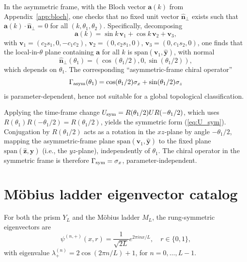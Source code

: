 \documentclass[aps,pra,reprint,amsmath,amssymb,superscriptaddress,nofootinbib,longbibliography]{revtex4-2}
\newcommand{\sigx}{\sigma_x}
\newcommand{\sigz}{\sigma_z}
\begin{document}
In the asymmetric frame, with the Bloch vector $\mathbf{a}(k)$ from Appendix~\ref{app:bloch}, one checks that no fixed unit vector $\hat{\mathbf{n}}_\perp$ exists such that $\mathbf{a}(k) \cdot \hat{\mathbf{n}}_\perp = 0$ for all $(k, \theta_1, \theta_2)$. Specifically, decomposing
\begin{equation}
\mathbf{a}(k) = \sin k\, \mathbf{v}_1 + \cos k\, \mathbf{v}_2 + \mathbf{v}_3,
\end{equation}
with $\mathbf{v}_1 = (c_2 s_1, 0, -c_1 c_2)$, $\mathbf{v}_2 = (0, c_2 s_1, 0)$, $\mathbf{v}_3 = (0, c_1 s_2, 0)$, one finds that the local-in-$\theta$ plane containing $\mathbf{a}$ for all $k$ is $\mathrm{span}(\mathbf{v}_1, \hat{\mathbf{y}})$, with normal
\begin{equation}
\hat{\mathbf{n}}_\perp(\theta_1) = (\cos(\theta_1/2), 0, \sin(\theta_1/2)),
\end{equation}
which depends on $\theta_1$. The corresponding ``asymmetric-frame chiral operator''
\begin{equation}
\Gamma_{\rm asym}(\theta_1) = \cos(\theta_1/2) \sigx + \sin(\theta_1/2) \sigz
\end{equation}
is parameter-dependent, hence not suitable for a global topological classification.

Applying the time-frame change $U_{\rm sym} = R(\theta_1/2) U R(-\theta_1/2)$, which uses $R(\theta_1) R(-\theta_1/2) = R(\theta_1/2)$, yields the symmetric form (\ref{eq:U_sym}). Conjugation by $R(\theta_1/2)$ acts as a rotation in the $xz$-plane by angle $-\theta_1/2$, mapping the asymmetric-frame plane $\mathrm{span}(\mathbf{v}_1, \hat{\mathbf{y}})$ to the fixed plane $\mathrm{span}(\hat{\mathbf{z}}, \hat{\mathbf{y}})$ (i.e., the $yz$-plane), independently of $\theta_1$. The chiral operator in the symmetric frame is therefore $\Gamma_{\rm sym} = \sigx$, parameter-independent.


\section{M\"obius ladder eigenvector catalog}
\label{app:eigenvectors}

For both the prism $Y_L$ and the M\"obius ladder $M_L$, the rung-symmetric eigenvectors are
\begin{equation}
\psi^{(n,+)}(x, r) = \frac{1}{\sqrt{2L}} e^{2\pi i n x / L}, \quad r \in \{0, 1\},
\end{equation}
with eigenvalue $\lambda_+^{(n)} = 2\cos(2\pi n/L) + 1$, for $n = 0, \dots, L-1$.
\end{document}
